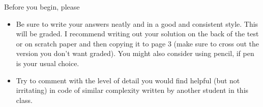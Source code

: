 Before you begin, please
\begin{itemize}
  \item Be sure to write your answers neatly and in a good and consistent
    style.  This will be graded.  I recommend writing out your solution on the
    back of the test or on scratch paper and then copying it to page 3 (make
    sure to cross out the version you don't want graded).  You might also
    consider using pencil, if pen is your usual choice.
  \item Try to comment with the level of detail you would find helpful (but not
    irritating) in code of similar complexity written by another student in
    this class.
\end{itemize}

\newpage

\textQuestion{~}



